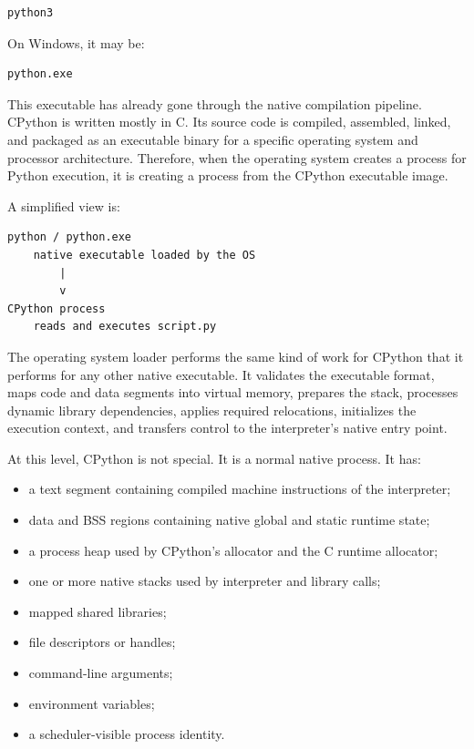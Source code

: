 \documentclass[a4paper,twoside]{report}
\begin{document}
\begin{verbatim}
python3
\end{verbatim}

On Windows, it may be:

\begin{verbatim}
python.exe
\end{verbatim}

This executable has already gone through the native compilation pipeline. CPython is written mostly in C. Its source code is compiled, assembled, linked, and packaged as an executable binary for a specific operating system and processor architecture. Therefore, when the operating system creates a process for Python execution, it is creating a process from the CPython executable image.

A simplified view is:

\begin{verbatim}
python / python.exe
    native executable loaded by the OS
        |
        v
CPython process
    reads and executes script.py
\end{verbatim}

The operating system loader performs the same kind of work for CPython that it performs for any other native executable. It validates the executable format, maps code and data segments into virtual memory, prepares the stack, processes dynamic library dependencies, applies required relocations, initializes the execution context, and transfers control to the interpreter's native entry point.

At this level, CPython is not special. It is a normal native process. It has:

\begin{itemize}
    \item a text segment containing compiled machine instructions of the interpreter;
    \item data and BSS regions containing native global and static runtime state;
    \item a process heap used by CPython's allocator and the C runtime allocator;
    \item one or more native stacks used by interpreter and library calls;
    \item mapped shared libraries;
    \item file descriptors or handles;
    \item command-line arguments;
    \item environment variables;
    \item a scheduler-visible process identity.
\end{itemize}
\end{document}
